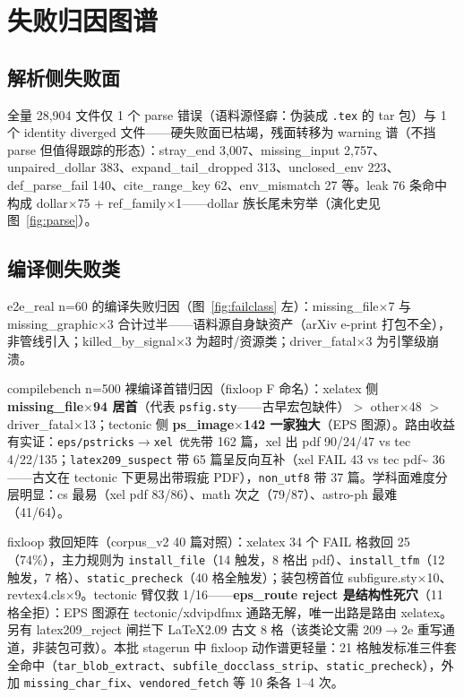 \section{失败归因图谱}
\label{sec:failures}

\subsection{解析侧失败面}

全量 28{,}904 文件仅 1 个 parse 错误（语料源怪癖：伪装成 \texttt{.tex} 的 tar 包）与 1 个 identity diverged 文件——硬失败面已枯竭，残面转移为 warning 谱（不挡 parse 但值得跟踪的形态）：stray\_end 3{,}007、missing\_input 2{,}757、unpaired\_dollar 383、expand\_tail\_dropped 313、unclosed\_env 223、def\_parse\_fail 140、cite\_range\_key 62、env\_mismatch 27 等。leak 76 条命中构成 dollar$\times$75 + ref\_family$\times$1——dollar 族长尾未穷举（演化史见图~\ref{fig:parse}）。

\subsection{编译侧失败类}

e2e\_real n=60 的编译失败归因（图~\ref{fig:failclass} 左）：missing\_file$\times$7 与 missing\_graphic$\times$3 合计过半——语料源自身缺资产（arXiv e-print 打包不全），非管线引入；killed\_by\_signal$\times$3 为超时/资源类；driver\_fatal$\times$3 为引擎级崩溃。

compilebench n=500 裸编译首错归因（fixloop F 命名）：xelatex 侧 \textbf{missing\_file$\times$94 居首}（代表 \texttt{psfig.sty}——古早宏包缺件）$>$ other$\times$48 $>$ driver\_fatal$\times$13；tectonic 侧 \textbf{ps\_image$\times$142 一家独大}（EPS 图源）。路由收益有实证：\texttt{eps/pstricks$\to$xel 优先}带 162 篇，xel 出 pdf 90/24/47 vs tec 4/22/135；\texttt{latex209\_suspect} 带 65 篇呈反向互补（xel FAIL 43 vs tec pdf\~{} 36——古文在 tectonic 下更易出带瑕疵 PDF），\texttt{non\_utf8} 带 37 篇。学科面难度分层明显：cs 最易（xel pdf 83/86）、math 次之（79/87）、astro-ph 最难（41/64）。

fixloop 救回矩阵（corpus\_v2 40 篇对照）：xelatex 34 个 FAIL 格救回 25（74\%），主力规则为 \texttt{install\_file}（14 触发，8 格出 pdf）、\texttt{install\_tfm}（12 触发，7 格）、\texttt{static\_precheck}（40 格全触发）；装包榜首位 subfigure.sty$\times$10、revtex4.cls$\times$9。tectonic 臂仅救 1/16——\textbf{eps\_route reject 是结构性死穴}（11 格全拒）：EPS 图源在 tectonic/xdvipdfmx 通路无解，唯一出路是路由 xelatex。另有 latex209\_reject 闸拦下 LaTeX2.09 古文 8 格（该类论文需 209$\to$2e 重写通道，非装包可救）。本批 stagerun 中 fixloop 动作谱更轻量：21 格触发标准三件套全命中（\texttt{tar\_blob\_extract}、\texttt{subfile\_docclass\_strip}、\texttt{static\_precheck}），外加 \texttt{missing\_char\_fix}、\texttt{vendored\_fetch} 等 10 条各 1--4 次。

